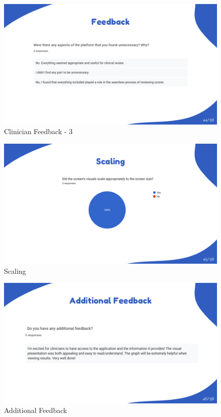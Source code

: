 \documentclass{article}
\begin{document}
\begin{figure}[H]
  \centering
  \includegraphics[width=\textwidth]{images/slide44.png}
  \caption{Clinician Feedback - 3}
  \label{fig:feedback_3}
\end{figure}

\begin{figure}[H]
  \centering
  \includegraphics[width=\textwidth]{images/slide45.png}
  \caption{Scaling}
  \label{fig:feedback_4}
\end{figure}

\begin{figure}[H]
  \centering
  \includegraphics[width=\textwidth]{images/slide46.png}
  \caption{Additional Feedback}
  \label{fig:feedback_5}
\end{figure}
\end{document}
